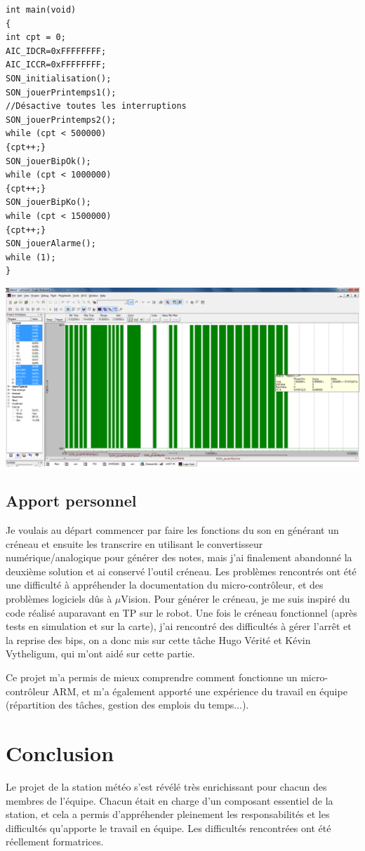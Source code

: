 \documentclass[a4paper]{report}
\begin{document}
\begin{verbatim}
int main(void)
{
int cpt = 0;
AIC_IDCR=0xFFFFFFFF;
AIC_ICCR=0xFFFFFFFF;
SON_initialisation();
SON_jouerPrintemps1();
//Désactive toutes les interruptions
SON_jouerPrintemps2();
while (cpt < 500000)
{cpt++;}
SON_jouerBipOk();
while (cpt < 1000000)
{cpt++;}
SON_jouerBipKo();
while (cpt < 1500000)
{cpt++;}
SON_jouerAlarme();
while (1);
}
\end{verbatim}

\begin{center}
	\includegraphics[scale=0.2]{images/SON_fig2.png}
\end{center}

\section{Apport personnel}
Je voulais au départ commencer par faire les fonctions du son en générant un créneau et ensuite les transcrire en utilisant le convertisseur numérique/analogique pour générer des notes, mais j'ai finalement abandonné la deuxième solution et ai conservé l'outil créneau.
Les problèmes rencontrés ont été une difficulté à appréhender la documentation du micro-contrôleur, et des problèmes logiciels dûs à $\mu$Vision.
Pour générer le créneau, je me suis inspiré du code réalisé auparavant en TP sur le robot.
Une fois le créneau fonctionnel (après tests en simulation et sur la carte), j'ai rencontré des difficultés à gérer l'arrêt et la reprise des bips, on a donc mis sur cette tâche Hugo Vérité et Kévin Vytheligum, qui m'ont aidé sur cette partie.

Ce projet m'a permis de mieux comprendre comment fonctionne un micro-contrôleur ARM, et m'a également apporté une expérience du travail en équipe (répartition des tâches, gestion des emplois du temps...).


\chapter*{Conclusion}
Le projet de la station météo s’est révélé très enrichissant pour chacun des membres de l’équipe.
Chacun était en charge d’un composant essentiel de la station, et cela a permis d’appréhender pleinement les responsabilités et les difficultés qu’apporte le travail en équipe.
Les difficultés rencontrées ont été réellement formatrices.
\end{document}
